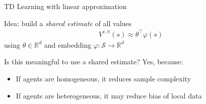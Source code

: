 \documentclass[aspectratio=169,12pt]{beamer}
\begin{document}
\begin{frame}{ TD Learning with linear approximation}

  Idea: build a \emph{shared estimate} of all values
  \begin{align*}
    V^{c,\pi}(s) \approx \theta^\top \varphi(s)
  \end{align*}
  using $\theta \in \mathbb{R}^d$ and embedding $\varphi: \mathcal{S} \rightarrow \mathbb{R}^d$

  \vspace{1em}
  
  \pause

  Is this meaningful to use a shared estimate? Yes, because:
  \begin{itemize}
  \item If agents are homogeneous, it reduces sample complexity
  \item If agents are heterogeneous, it may reduce bias of local data
  \end{itemize}
\end{frame}
\end{document}
